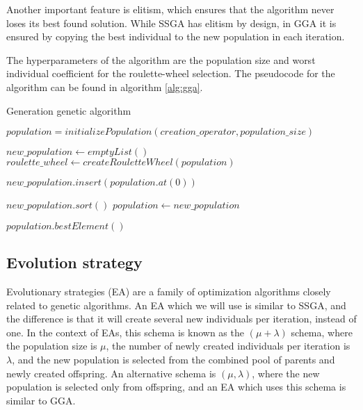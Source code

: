Another important feature is elitism, which ensures that the algorithm never loses its best found solution. While SSGA has elitism by design, in GGA it is ensured by copying the best individual to the new population in each iteration.

The hyperparameters of the algorithm are the population size and worst individual coefficient for the roulette-wheel selection. The pseudocode for the algorithm can be found in algorithm \ref{alg:gga}.

\begin{algorithm}[!htbp]
    \caption{Generation genetic algorithm}
    \label{alg:gga}

    $population = initializePopulation(creation\_operator, population\_size)$\;

     {
        $new\_population \gets emptyList()$\;
        $roulette\_wheel \gets createRouletteWheel(population)$\;

        $new\_population.insert(population.at(0))$\;


        $new\_population.sort()$\;
        $population \gets new\_population$\;
    }

    \Return $population.bestElement()$\;
    \end{algorithm}

\subsection{Evolution strategy}
\label{sec:es}
Evolutionary strategies (EA) are a family of optimization algorithms closely related to genetic algorithms. An EA which we will use is similar to SSGA, and the difference is that it will create several new individuals per iteration, instead of one. In the context of EAs, this schema is known as the $(\mu + \lambda)$ schema, where the population size is $\mu$, the number of newly created individuals per iteration is $\lambda$, and the new population is selected from the combined pool of parents and newly created offspring. An alternative schema is $(\mu, \lambda)$, where the new population is selected only from offspring, and an EA which uses this schema is similar to GGA.

